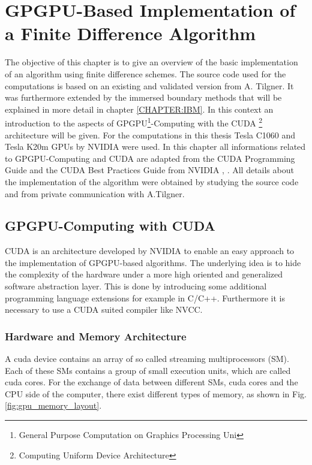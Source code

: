 \chapter[ GPGPU-Based Implementation of a Finite Difference Algorithm]{GPGPU-Based Implementation of \\ a Finite Difference Algorithm}

\label{CHAPTER:CUDA}

The objective of this chapter is to give an overview of the basic implementation of an algorithm using finite difference schemes.
The source code used for the computations is based on an existing and validated version from A. Tilgner.
It was furthermore extended by the immersed boundary methods that will be explained in more detail in chapter \ref{CHAPTER:IBM}.
In this context an introduction to the aspects of GPGPU\footnote{General Purpose Computation on Graphics Processing Uni}-Computing
with the CUDA \footnote{Computing Uniform Device Architecture} architecture will be given.
For the computations in this thesis Tesla C1060 and Tesla K20m GPUs by NVIDIA were used. %
In this chapter all informations related to GPGPU-Computing and CUDA are adapted from the CUDA Programming Guide and the CUDA Best Practices Guide from NVIDIA
\citep{CUDAPG}, \citep{CUDABP}. All details about the implementation of the algorithm were obtained by studying the source code
and from private communication with A.Tilgner.

\section{GPGPU-Computing with CUDA}

CUDA is an architecture developed by NVIDIA to enable an easy approach to the implementation of GPGPU-based algorithms.
The underlying idea is to hide the complexity of the hardware under a more high oriented and generalized software abstraction layer.
This is done by introducing some additional programming language extensions for example in C/C++.
Furthermore it is necessary to use a CUDA suited compiler like NVCC.

\subsection{Hardware and Memory Architecture}

A cuda device contains an array of so called streaming multiprocessors (SM).
Each of these SMs contains a group of small execution units, which are called cuda cores.
For the exchange of data between different SMs, cuda cores and the CPU side of the computer, there exist different
types of memory, as shown  in Fig.  \ref{fig:gpu_memory_layout}.
\newpage

